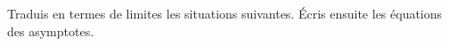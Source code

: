 \documentclass[a4paper,12pt]{report}
\begin{document}
\begin{exercice}
Traduis en termes de limites les situations suivantes. Écris ensuite
les équations des asymptotes.
\par \setlength{\columnseprule}{0 pt}
          \begin{minipage}[t]{\linewidth}
          \begin{multicols}{2}




\end{multicols}\end{minipage}

\par \setlength{\columnseprule}{0 pt}
          \begin{minipage}[t]{\linewidth}
          \begin{multicols}{2}





\end{multicols}\end{minipage}
\end{exercice}
\end{document}
